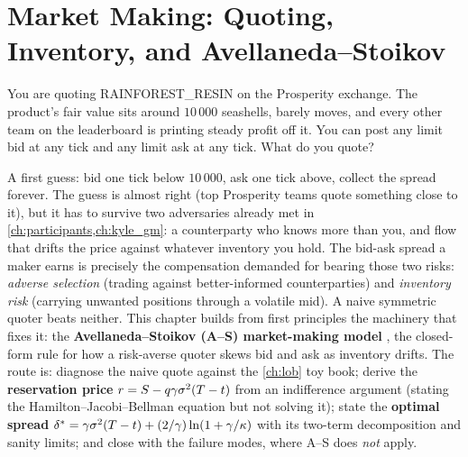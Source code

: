 \chapter{Market Making: Quoting, Inventory, and Avellaneda--Stoikov}
\label{ch:market_making}

You are quoting RAINFOREST\_RESIN on the Prosperity exchange. The
product's fair value sits around $10\,000$ seashells, barely moves,
and every other team on the leaderboard is printing steady profit off
it. You can post any limit bid at any tick and any limit ask at any
tick. What do you quote?

A first guess: bid one tick below $10\,000$, ask one tick above,
collect the spread forever. The guess is almost right (top
Prosperity teams quote something close to it), but it has to survive
two adversaries already met in \cref{ch:participants,ch:kyle_gm}: a
counterparty who knows more than you, and flow that drifts the price
against whatever inventory you hold. The bid-ask spread a maker earns
is precisely the compensation demanded for bearing those two
risks: \emph{adverse selection} (trading against better-informed
counterparties) and \emph{inventory risk} (carrying unwanted positions
through a volatile mid). A naive symmetric quoter beats neither. This chapter builds from first principles the machinery that
fixes it: the \textbf{Avellaneda--Stoikov (A--S) market-making model}
\citeAS{}, the closed-form rule for how a risk-averse quoter skews
bid and ask as inventory drifts. The route is: diagnose the naive
quote against the \cref{ch:lob} toy book; derive the
\textbf{reservation price} $r = S - q\gamma\sigma^2(T-t)$
from an indifference argument (stating the Hamilton--Jacobi--Bellman
equation but not solving it); state the \textbf{optimal spread}
$\delta^* = \gamma\sigma^2(T-t) + (2/\gamma)\ln(1 + \gamma/\kappa)$
with its two-term decomposition and sanity limits; and close with the
failure modes, where A--S does \emph{not} apply.

